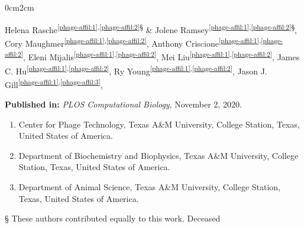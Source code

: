 \setcounter{NAT@ctr}{-1}
\cleartorightpage
\chapter*{}\label{chapter:phages}


\begin{changemargin}{0cm}{2cm}
\end{changemargin}

Helena Rasche\textsuperscript{\ref{phage-affil:1},\ref{phage-affil:2}§} \&
Jolene Ramsey\textsuperscript{\ref{phage-affil:1},\ref{phage-affil:2}§},
Cory Maughmer\textsuperscript{\ref{phage-affil:1},\ref{phage-affil:2}},
Anthony Criscione\textsuperscript{\ref{phage-affil:1},\ref{phage-affil:2}},
Eleni Mijalis\textsuperscript{\ref{phage-affil:1},\ref{phage-affil:2}},
Mei Liu\textsuperscript{\ref{phage-affil:1},\ref{phage-affil:2}},
James C. Hu\textsuperscript{\ref{phage-affil:1},\ref{phage-affil:2}\dag},
Ry Young\textsuperscript{\ref{phage-affil:1},\ref{phage-affil:2}},
Jason J. Gill\textsuperscript{\ref{phage-affil:1},\ref{phage-affil:3}},

\textbf{Published in:} \emph{PLOS Computational Biology}, November 2, 2020.\\

\small
\begin{enumerate}
\itemsep-0.5em
\item Center for Phage Technology, Texas A\&M University, College Station, Texas, United States of America.\label{phage-affil:1}
\item Department of Biochemistry and Biophysics, Texas A\&M University, College Station, Texas, United States of America.\label{phage-affil:2}
\item Department of Animal Science, Texas A\&M University, College Station, Texas, United States of
America.\label{phage-affil:3}
\end{enumerate}

§ These authors contributed equally to this work.
\dag Deceased
\normalsize


